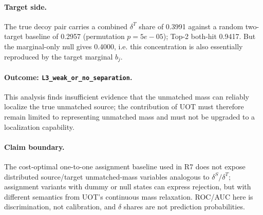 \paragraph{Target side.} The true decoy pair carries a combined $\delta^T$ share of
0.3991 against a random two-target baseline of 0.2957
(permutation $p = 5e-05$); Top-2 both-hit 0.9417. But the
marginal-only null gives 0.4000, i.e. this concentration is
also essentially reproduced by the target marginal $b_j$.

\paragraph{Outcome: \texttt{L3_weak_or_no_separation}.} This analysis finds insufficient evidence that the unmatched mass can reliably localize the true unmatched source; the contribution of UOT must therefore remain limited to representing unmatched mass and must not be upgraded to a localization capability.

\paragraph{Claim boundary.} The cost-optimal one-to-one assignment baseline used in R7 does
not expose distributed source/target unmatched-mass variables analogous to
$\delta^S/\delta^T$; assignment variants with dummy or null states can express rejection,
but with different semantics from UOT's continuous mass relaxation. ROC/AUC here is
discrimination, not calibration, and $\delta$ shares are not prediction probabilities.
